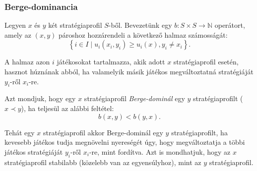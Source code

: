 \begin{table}[t]
  \centering
  \caption{Példa egy fogolydilemma típusú játékra.}\label{tab:BERGE_EGYENSULY}
\end{table}


\subsubsection{Berge-dominancia}
Legyen $x$ és $y$ két stratégiaprofil $S$-ből.
Bevezetünk egy $b \colon S \times S \to \mathbb{N}$ operátort, amely az $\left( x, y \right)$ pároshoz hozzárendeli a következő halmaz számosságát:
\[
  \left\{ i \in I \mid u_i(x_i, y_i) \ge u_i(x), y_i \neq x_i \right\}.
\]

A halmaz azon $i$ játékosokat tartalmazza, akik adott $x$ stratégiaprofil esetén, hasznot húznának abból, ha valamelyik másik játékos megváltoztatná stratégiáját $y_i$-ről $x_i$-re.

\begin{ert}
  Azt mondjuk, hogy egy $x$ stratégiaprofil \emph{Berge-dominál} egy $y$ stratégiaprofilt ($x \prec y$), ha teljesül az alábbi feltétel:
  \[
    b(x,y) < b(y, x).
  \]
\end{ert}

Tehát egy $x$ stratégiaprofil akkor Berge-dominál egy $y$ stratégiaprofilt, ha kevesebb játékos tudja megnövelni nyereségét úgy, hogy megváltoztatja a többi játékos stratégiáját $y_i$-ről $x_i$-re, mint fordítva.
Azt is mondhatjuk, hogy az $x$ stratégiaprofil stabilabb (közelebb van az egyensúlyhoz), mint az $y$ stratégiaprofil.



